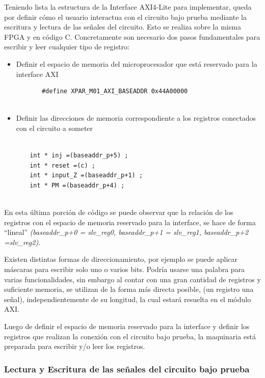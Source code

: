 \documentclass[a4paper,openright,12pt]{report}
\begin{document}
    Teniendo lista la estructura de la Interface AXI4-Lite para implementar, queda por definir cómo el usuario interactua con el circuito bajo prueba mediante la escritura y  lectura de las señales del circuito. Esto se realiza  sobre la misma FPGA y en código C. 
Concretamente son necesario dos pasos fundamentales para  escribir y leer cualquier tipo de registro:
    \begin{itemize}
    \item Definir el espacio de memoria del microprocesador que está reservado para la interface AXI
     \begin{lstlisting}
       #define XPAR_M01_AXI_BASEADDR 0x44A00000
      
      \end{lstlisting}
      
      
     \item Definir las direcciones de memoria correspondiente a los registros conectados con el circuito a someter 
    \end{itemize}
    
      \begin{lstlisting}
      
       int * inj =(baseaddr_p+5) ;
       int * reset =(c) ;
       int * input_Z =(baseaddr_p+1) ;
       int * PM =(baseaddr_p+4) ;
      
      \end{lstlisting}
      En esta última porción de código se puede observar que la relación de los  registros con el espacio de memoria reservado para la interface, se hace de forma ``lineal'' \textit{(baseaddr\_p+0 = slv\_reg0, baseaddr\_p+1 = slv\_reg1, baseaddr\_p+2 =slv\_reg2)}. 
      
 Existen distintas formas de direccionamiento, por ejemplo se puede aplicar máscaras para escribir solo uno o varios bits. Podría usarse una palabra para varias funcionalidades, sin embargo al contar con una gran cantidad de registros y suficiente memoria, se utilizan de la forma más directa posible, (un registro una señal), independientemente de su longitud, la cual estará resuelta en el módulo AXI.    
 
      Luego de  definir el espacio de memoria reservado para la interface y definir los registros que realizan la conexión con el circuito bajo prueba, la maquinaria está preparada para escribir y/o leer los registros.
      
      \subsubsection{ Lectura y Escritura de las señales del circuito bajo prueba}
      
\end{document}
